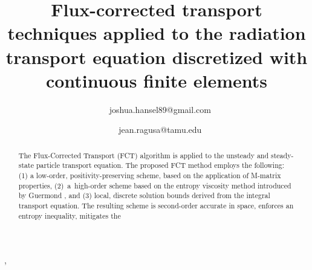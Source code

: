 \documentclass[xchauthor,chkrefs,fixeqskip,GCNS,amsmath,amsthm]{yjcphg}
\theoremstyle{remark}
\begin{document}
%
\begin{frontmatter}
\title{Flux-corrected transport techniques applied to the
radiation transport equation discretized with continuous finite elements}
%
\begin{aug}
\author{~\ead
{joshua.hansel89@gmail.com}},
\author{~\ead
{jean.ragusa@tamu.edu}}
%
\address{,
, , 
, }
\end{aug}
%
%
%
%
%
%
\begin{abstract}
The Flux-Corrected Transport (FCT) algorithm is applied to the unsteady
and steady-state particle transport equation. The proposed FCT method
employs the following: (1) a low-order, positivity-preserving scheme,
based on the application of M-matrix properties, (2)~a~high-order scheme
based on the entropy viscosity method introduced by Guermond
\cite{guermond_ev}, and (3) local, discrete solution bounds derived from
the integral transport equation. The resulting scheme is second-order
accurate in space, enforces an entropy inequality, mitigates the

\end{abstract}
\end{frontmatter}
\end{document}
